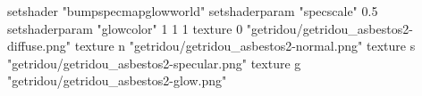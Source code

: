 setshader "bumpspecmapglowworld"
setshaderparam "specscale" 0.5
setshaderparam "glowcolor" 1 1 1
texture 0 "getridou/getridou_asbestos2-diffuse.png"
texture n "getridou/getridou_asbestos2-normal.png"
texture s "getridou/getridou_asbestos2-specular.png"
texture g "getridou/getridou_asbestos2-glow.png"
